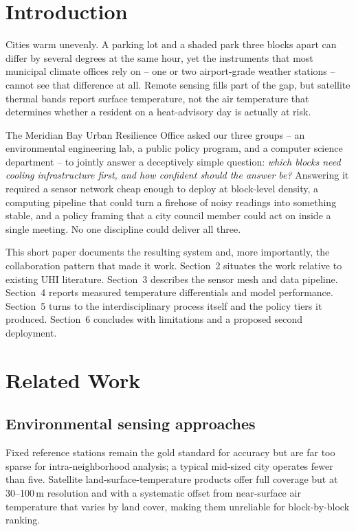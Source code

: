 \documentclass[10pt,twocolumn]{article}
\begin{document}

\section{Introduction}
Cities warm unevenly. A parking lot and a shaded park three blocks apart can differ by several
degrees at the same hour, yet the instruments that most municipal climate offices rely on --
one or two airport-grade weather stations -- cannot see that difference at all. Remote sensing
fills part of the gap, but satellite thermal bands report surface temperature, not the air
temperature that determines whether a resident on a heat-advisory day is actually at risk.

The Meridian Bay Urban Resilience Office asked our three groups -- an environmental engineering
lab, a public policy program, and a computer science department -- to jointly answer a
deceptively simple question: \emph{which blocks need cooling infrastructure first, and how
confident should the answer be?} Answering it required a sensor network cheap enough to deploy
at block-level density, a computing pipeline that could turn a firehose of noisy readings into
something stable, and a policy framing that a city council member could act on inside a single
meeting. No one discipline could deliver all three.

This short paper documents the resulting system and, more importantly, the collaboration
pattern that made it work. Section~2 situates the work relative to existing UHI literature.
Section~3 describes the sensor mesh and data pipeline. Section~4 reports measured
temperature differentials and model performance. Section~5 turns to the interdisciplinary
process itself and the policy tiers it produced. Section~6 concludes with limitations and a
proposed second deployment.

\section{Related Work}

\subsection{Environmental sensing approaches}
Fixed reference stations remain the gold standard for accuracy but are far too sparse for
intra-neighborhood analysis; a typical mid-sized city operates fewer than five. Satellite
land-surface-temperature products offer full coverage but at 30--100\,m resolution and with
a systematic offset from near-surface air temperature that varies by land cover, making them
unreliable for block-by-block ranking.
\end{document}
